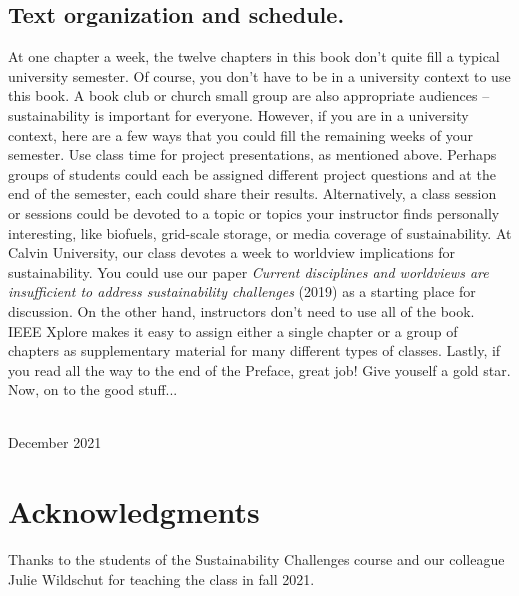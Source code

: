{\section{Text organization and schedule.} At one chapter a week, the twelve chapters
in this book don't quite fill a typical university semester. Of course, you don't
have to be in a university context to use this book. A book club or church small group 
are also appropriate audiences -- sustainability is important for everyone. However,
if you are in a university context, here are a few ways that you could fill the 
remaining weeks of your semester. Use class time for project presentations, as
mentioned above. Perhaps groups of students could each be assigned different 
project questions and at the end of the semester, each could share their results.
Alternatively, a class session or sessions could be devoted to a topic or topics your instructor
finds personally interesting, like biofuels, grid-scale storage, or media coverage
of sustainability. At Calvin University, our class devotes a week to worldview
implications for sustainability. You could use our paper \emph{Current disciplines 
and worldviews are insufficient to address sustainability challenges} (2019) as a 
starting place for discussion. %
On the other hand, instructors don't need to use all of the book. IEEE Xplore
makes it easy to assign either a single chapter or a group of chapters as supplementary
material for many different types of classes.
Lastly, if you read all the way to the end of the Preface, great job! Give youself a 
gold star. Now, on to the good stuff...


\vspace*{2pc}
\noindent\AUTHORS\\
\noindent December 2021
}

\clearpage




\blankpage

\chapter*{Acknowledgments}
\thispagestyle{plain}

\noindent
Thanks to the students of the Sustainability Challenges course and our colleague 
Julie Wildschut for teaching the class in fall 2021.

